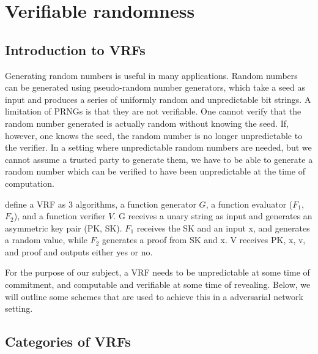 \section{Verifiable randomness}
\label{sec:vrf}

\subsection{Introduction to VRFs}
Generating random numbers is useful in many applications. Random numbers can be generated using pseudo-random number generators, which take a seed as input and produces a series of uniformly random and unpredictable bit strings. A limitation of PRNGs is that they are not verifiable. One cannot verify that the random number generated is actually random without knowing the seed. If, however, one knows the seed, the random number is no longer unpredictable to the verifier. In a setting where unpredictable random numbers are needed, but we cannot assume a trusted party to generate them, we have to be able to generate a random number which can be verified to have been unpredictable at the time of computation.

\cite{micali_verifiable_1999} define a VRF as 3 algorithms, a function generator $G$, a function evaluator ($F_1$, $F_2$), and a function verifier $V$. G receives a unary string as input and generates an asymmetric key pair (PK, SK). $F_1$ receives the SK and an input x, and generates a random value, while $F_2$ generates a proof from SK and x. V receives PK, x, v, and proof and outputs either yes or no.

For the purpose of our subject, a VRF needs to be unpredictable at some time of commitment, and computable and verifiable at some time of revealing. Below, we will outline some schemes that are used to achieve this in a adversarial network setting.


\subsection{Categories of VRFs}

